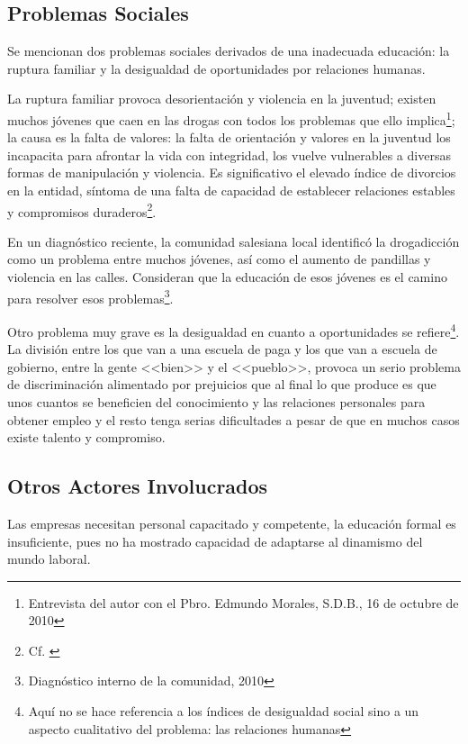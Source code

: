 

\subsection{Problemas Sociales}

Se mencionan dos problemas sociales derivados de una inadecuada educación: la ruptura familiar y la desigualdad de oportunidades por relaciones humanas.

La ruptura familiar provoca desorientación y violencia en la juventud; existen muchos j\'ovenes que caen en las drogas con todos los problemas que ello implica\footnote{Entrevista del autor con el Pbro. Edmundo Morales, S.D.B., 16 de octubre de 2010}; la causa es la falta de valores: la falta de orientación y valores en la juventud los incapacita para afrontar la vida con integridad, los vuelve vulnerables a diversas formas de manipulación y violencia. Es significativo el elevado índice de divorcios en la entidad, síntoma de una falta de capacidad de establecer relaciones estables y compromisos duraderos\footnote{Cf. \citep{Morales09}}.

En un diagnóstico reciente, la comunidad salesiana local identificó la drogadicción como un problema entre muchos jóvenes, así como el aumento de pandillas y violencia en las calles. Consideran que la educación de esos jóvenes es el camino para resolver esos problemas\footnote{Diagnóstico interno de la comunidad, 2010}.

Otro problema muy grave es la desigualdad en cuanto a oportunidades se refiere\footnote{Aquí no se hace referencia a los índices de desigualdad social sino a un aspecto cualitativo del problema: las relaciones humanas}. La división entre los que van a una escuela de paga y los que van a escuela de gobierno, entre la gente <<bien>> y el <<pueblo>>, provoca un serio problema de discriminación alimentado por prejuicios que al final lo que produce es que unos cuantos se beneficien del conocimiento y las relaciones personales para obtener empleo y el resto tenga serias dificultades a pesar de que en muchos casos existe talento y compromiso.

\subsection{Otros Actores Involucrados}

Las empresas necesitan personal capacitado y competente, la educación formal es insuficiente, pues no ha mostrado capacidad de adaptarse al dinamismo del mundo laboral.

